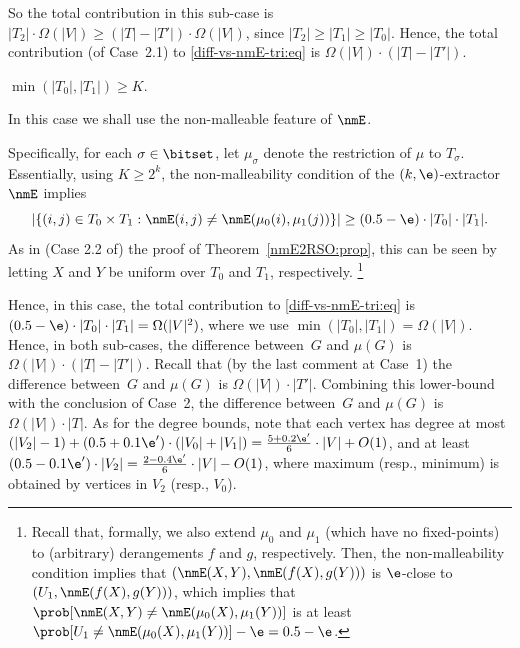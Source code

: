 So the total contribution in this sub-case is
$|T_2|\cdot\Omega(|V|)\geq(|T|-|T'|)\cdot\Omega(|V|)$,
since $|T_2|\geq|T_1|\geq|T_0|$.
\EE
Hence, the total contribution (of Case~2.1)
to \eqref{diff-vs-nmE-tri:eq} is $\Omega(|V|)\cdot(|T|-|T'|)$.

%
%
\item[{\em Case 2.2}:] $\min(|T_0|,|T_1|)\geq K$.

In this case we shall use the non-malleable feature of $\nmE$.

Specifically, for each $\sigma\in\bitset$,
let $\mu_\sigma$ denote the restriction of $\mu$ to $T_\sigma$.
%
%
Essentially, using $K\geq2^k$,
the non-malleability condition of the $(k,\e)$-extractor $\nmE$ implies
%
$$\left|\left\{(i,j)\in T_0\times T_1:
            \nmE(i,j)\neq\nmE(\mu_0(i),\mu_1(j))\right\}\right|
  \geq(0.5-\e)\cdot|T_0|\cdot|T_1|.$$
As in (Case 2.2 of) the proof of Theorem~\ref{nmE2RSO:prop},
this can be seen by
letting $X$ and $Y$ be uniform over $T_0$ and $T_1$, respectively.
\footnote{Recall that, formally, we also
extend $\mu_0$ and $\mu_1$ (which have no fixed-points)
to (arbitrary) derangements $f$ and $g$, respectively.
Then, the non-malleability condition implies
that $(\nmE(X,Y),\nmE(f(X),g(Y)))$ is $\e$-close to $(U_1,\nmE(f(X),g(Y)))$,
which implies that $\prob[\nmE(X,Y)\neq\nmE(\mu_0(X),\mu_1(Y))]$
is at least $\prob[U_1\neq\nmE(\mu_0(X),\mu_1(Y))]-\e=0.5-\e$.}
%
%
%
%
%
%
%
%
%
%
%
%
%
%
%
%
%
%
%
%
%
%
%

%
%
Hence, in this case,
the total contribution to \eqref{diff-vs-nmE-tri:eq} is
$(0.5-\e)\cdot|T_0|\cdot|T_1|=\Omega(|V|^2)$,
where we use $\min(|T_0|,|T_1|)=\Omega(|V|)$.
%
\EDes
Hence, in both sub-cases, the difference between~$G$ and $\mu(G)$
is $\Omega(|V|)\cdot(|T|-|T'|)$.
\EDes
Recall that (by the last comment at Case~1)
the difference between~$G$ and $\mu(G)$
is $\Omega(|V|)\cdot|T'|$.
Combining this lower-bound with the conclusion of Case~2,
the difference between~$G$ and $\mu(G)$ is $\Omega(|V|)\cdot|T|$.
%
As for the degree bounds,
note that each vertex has degree at most
$(|V_2|-1)+(0.5+0.1\e')\cdot(|V_0|+|V_1|)=\frac{5+0.2\e'}{6}\cdot|V|+O(1)$,
and at least $(0.5-0.1\e')\cdot|V_2|=\frac{2-0.4\e'}{6}\cdot|V|-O(1)$,
%
%
where maximum (resp., minimum) is obtained
by vertices in $V_2$ (resp., $V_0$).
%
\EPF

